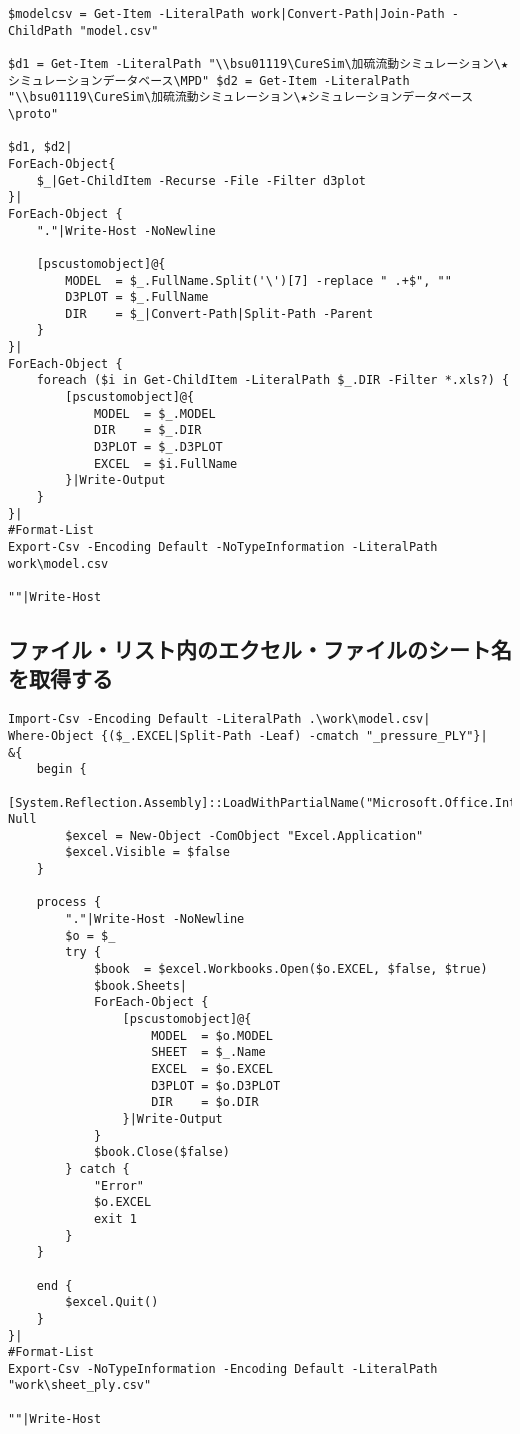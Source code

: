 \documentclass[dvipdfmx]{jsarticle}
\begin{document}
\begin{verbatim}
$modelcsv = Get-Item -LiteralPath work|Convert-Path|Join-Path -ChildPath "model.csv"

$d1 = Get-Item -LiteralPath "\\bsu01119\CureSim\加硫流動シミュレーション\★シミュレーションデータベース\MPD" $d2 = Get-Item -LiteralPath "\\bsu01119\CureSim\加硫流動シミュレーション\★シミュレーションデータベース\proto"

$d1, $d2|
ForEach-Object{
    $_|Get-ChildItem -Recurse -File -Filter d3plot
}|
ForEach-Object {
    "."|Write-Host -NoNewline

    [pscustomobject]@{
        MODEL  = $_.FullName.Split('\')[7] -replace " .+$", ""
        D3PLOT = $_.FullName
        DIR    = $_|Convert-Path|Split-Path -Parent
    }
}|
ForEach-Object {
    foreach ($i in Get-ChildItem -LiteralPath $_.DIR -Filter *.xls?) {
        [pscustomobject]@{
            MODEL  = $_.MODEL
            DIR    = $_.DIR
            D3PLOT = $_.D3PLOT
            EXCEL  = $i.FullName
        }|Write-Output
    }
}|
#Format-List
Export-Csv -Encoding Default -NoTypeInformation -LiteralPath work\model.csv

""|Write-Host

\end{verbatim}



\subsection{ファイル・リスト内のエクセル・ファイルのシート名を取得する}

\begin{verbatim}
Import-Csv -Encoding Default -LiteralPath .\work\model.csv|
Where-Object {($_.EXCEL|Split-Path -Leaf) -cmatch "_pressure_PLY"}|
&{
    begin {
        [System.Reflection.Assembly]::LoadWithPartialName("Microsoft.Office.Interop.Excel")|Out-Null
        $excel = New-Object -ComObject "Excel.Application"
        $excel.Visible = $false
    }

    process {
        "."|Write-Host -NoNewline
        $o = $_
        try {
            $book  = $excel.Workbooks.Open($o.EXCEL, $false, $true)
            $book.Sheets|
            ForEach-Object {
                [pscustomobject]@{
                    MODEL  = $o.MODEL
                    SHEET  = $_.Name
                    EXCEL  = $o.EXCEL
                    D3PLOT = $o.D3PLOT
                    DIR    = $o.DIR
                }|Write-Output
            }
            $book.Close($false)
        } catch {
            "Error"
            $o.EXCEL
            exit 1
        }        
    }

    end {
        $excel.Quit()        
    }
}| 
#Format-List
Export-Csv -NoTypeInformation -Encoding Default -LiteralPath "work\sheet_ply.csv"

""|Write-Host
\end{verbatim}
\end{document}
